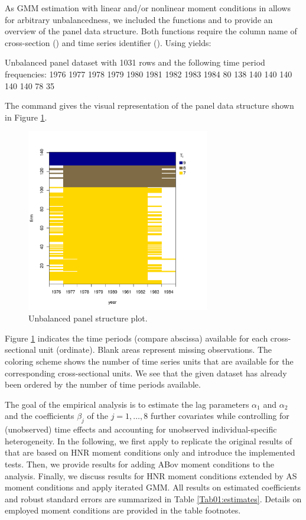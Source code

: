 As GMM estimation with linear and/or nonlinear moment conditions in  allows for arbitrary unbalancedness, we included the functions  and  to provide an overview of the panel data structure. Both functions require the column name of cross-section () and time series identifier ().
Using  yields:
\begin{example}
Unbalanced panel dataset with 1031 rows and the following time period frequencies:
1976 1977 1978 1979 1980 1981 1982 1983 1984
  80  138  140  140  140  140  140   78   35
\end{example}
The command  gives the visual representation of the panel data structure shown in Figure \ref{fig:strucUPDplot}.
\begin{figure}[ht]
  \centering
  \includegraphics[width = 8cm, height = 8cm]{strucUPD_plot.pdf}
  \caption{Unbalanced panel structure plot.}\label{fig:strucUPDplot}
\end{figure}
Figure \ref{fig:strucUPDplot} indicates the time periods (compare abscissa) available for each cross-sectional unit (ordinate). Blank areas represent missing observations. The coloring scheme shows the number of time series units that are available for the corresponding cross-sectional units. We see that the given dataset has already been ordered by the number of time periods available.









The goal of the empirical analysis is to estimate the lag parameters $\alpha_1$ and $\alpha_2$ and the coefficients $\beta_j$ of the $j=1, \dots, 8$ further covariates while controlling for (unobserved) time effects and accounting for unobserved individual-specific heterogeneity. In the following, we first apply  to replicate the original results of \citet{AreBon1991} that are based on HNR moment conditions only and introduce the implemented tests. Then, we provide results for adding ABov moment conditions to the analysis. Finally, we discuss results for HNR moment conditions extended by AS moment conditions and apply iterated GMM. All results on estimated coefficients and robust standard errors are summarized in Table \ref{Tab01:estimates}. Details on employed moment conditions are provided in the table footnotes.

